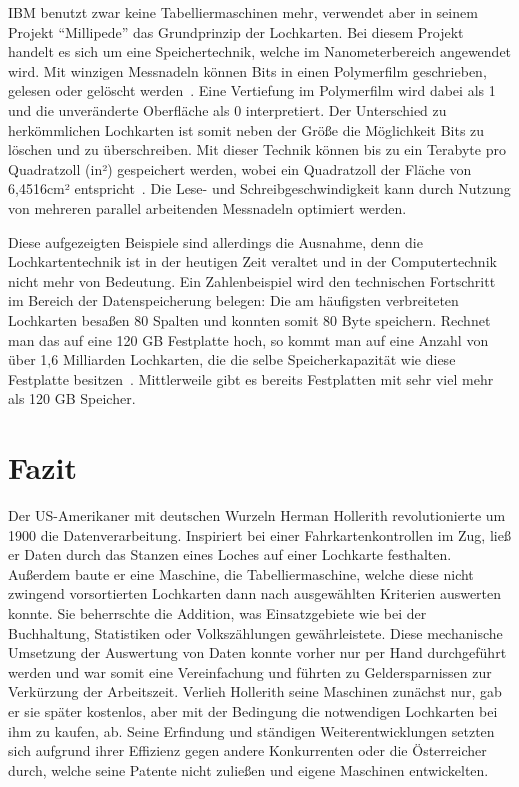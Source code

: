 \documentclass[parskip=half]{scrartcl}
\begin{document}
IBM benutzt zwar keine Tabelliermaschinen mehr, verwendet aber in seinem
Projekt \enquote{Millipede} das Grundprinzip der Lochkarten. Bei diesem Projekt
handelt es sich um eine Speichertechnik, welche im Nanometerbereich angewendet
wird.  Mit winzigen Messnadeln können Bits in einen Polymerfilm geschrieben,
gelesen oder gelöscht werden~\cite{binnig}. Eine Vertiefung im
Polymerfilm wird dabei als 1 und die unveränderte Oberfläche als 0
interpretiert. Der Unterschied zu herkömmlichen Lochkarten ist somit neben der
Größe die Möglichkeit Bits zu löschen und zu überschreiben. Mit dieser Technik
können bis zu ein Terabyte pro Quadratzoll (in²) gespeichert werden, wobei ein
Quadratzoll der Fläche von 6,4516cm² entspricht~\cite{binnig}. Die
Lese- und Schreibgeschwindigkeit kann durch Nutzung von mehreren parallel
arbeitenden Messnadeln optimiert werden.

Diese aufgezeigten Beispiele sind allerdings die Ausnahme, denn die
Lochkartentechnik ist in der heutigen Zeit veraltet und in der Computertechnik
nicht mehr von Bedeutung. Ein Zahlenbeispiel wird den technischen Fortschritt
im Bereich der Datenspeicherung belegen: Die am häufigsten verbreiteten
Lochkarten besaßen 80 Spalten und konnten somit 80 Byte speichern. Rechnet man
das auf eine 120 GB Festplatte hoch, so kommt man auf eine Anzahl von über 1,6
Milliarden Lochkarten, die die selbe Speicherkapazität wie diese Festplatte
besitzen~\cite{roeltgen}. Mittlerweile gibt es bereits Festplatten mit sehr
viel mehr als 120 GB Speicher.

\section{Fazit}

Der US-Amerikaner mit deutschen Wurzeln Herman Hollerith revolutionierte um
1900 die Datenverarbeitung.  Inspiriert bei einer Fahrkartenkontrollen im Zug,
ließ er Daten durch das Stanzen eines Loches auf einer Lochkarte festhalten.
Außerdem baute er eine Maschine, die Tabelliermaschine, welche diese nicht
zwingend vorsortierten Lochkarten dann nach ausgewählten Kriterien auswerten
konnte.  Sie beherrschte die Addition, was Einsatzgebiete wie bei der
Buchhaltung, Statistiken oder Volkszählungen gewährleistete. Diese mechanische
Umsetzung der Auswertung von Daten konnte vorher nur per Hand durchgeführt
werden und war somit eine Vereinfachung und führten zu Geldersparnissen zur
Verkürzung der Arbeitszeit.  Verlieh Hollerith seine Maschinen zunächst nur,
gab er sie später kostenlos, aber mit der Bedingung die notwendigen Lochkarten
bei ihm zu kaufen, ab.  Seine Erfindung und ständigen Weiterentwicklungen
setzten sich aufgrund ihrer Effizienz gegen andere Konkurrenten oder die
Österreicher durch, welche seine Patente nicht zuließen und eigene Maschinen
entwickelten.
\end{document}
